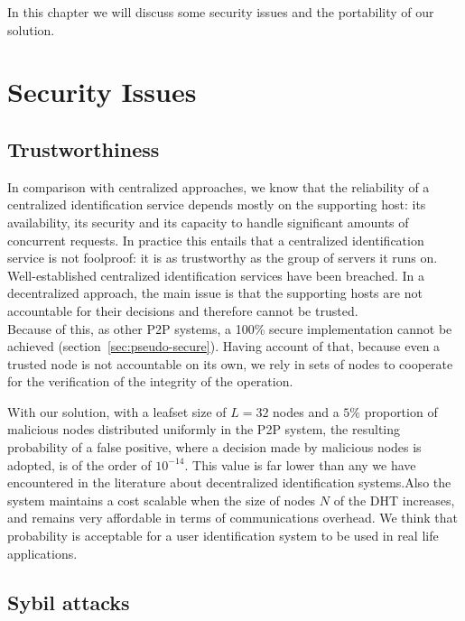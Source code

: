 In this chapter we will discuss some security issues and the portability of our
solution.%

\section{Security Issues}
\subsection{Trustworthiness}
In comparison with centralized approaches, we know that the reliability of a
centralized identification service depends mostly on the
supporting host: its availability, its security and its capacity  to handle
significant amounts of concurrent requests. 
In practice this entails that a centralized identification service is not
foolproof: it is as trustworthy as the group of servers it runs on.
Well-established centralized identification services have been breached. %
In a decentralized approach, the main issue is that the supporting hosts are
not accountable for their decisions and therefore cannot be trusted.\\

Because of this, as other P2P systems, a 100\% secure implementation cannot be achieved
(section~\ref{sec:pseudo-secure}).
Having account of that, because even a trusted node is not accountable on its
own, we rely in sets of nodes to cooperate for the verification of the
integrity of the operation.

With our solution, with a leafset size of $L = 32$ nodes and a
$5\%$ proportion of malicious nodes distributed uniformly in the P2P system, the resulting probability of a false
positive, where a decision made by malicious nodes is adopted, is of the order
of $10^{-14}$. 
This value is far lower than any we have encountered in the
literature about decentralized identification systems.Also the system maintains a cost scalable when the size of nodes $N$ of the DHT
increases, and remains very affordable in terms of communications overhead. 
We think that probability is acceptable for a user identification system to be
used in real life applications.


\subsection{Sybil attacks}
\label{sec:sybil_attacks}

